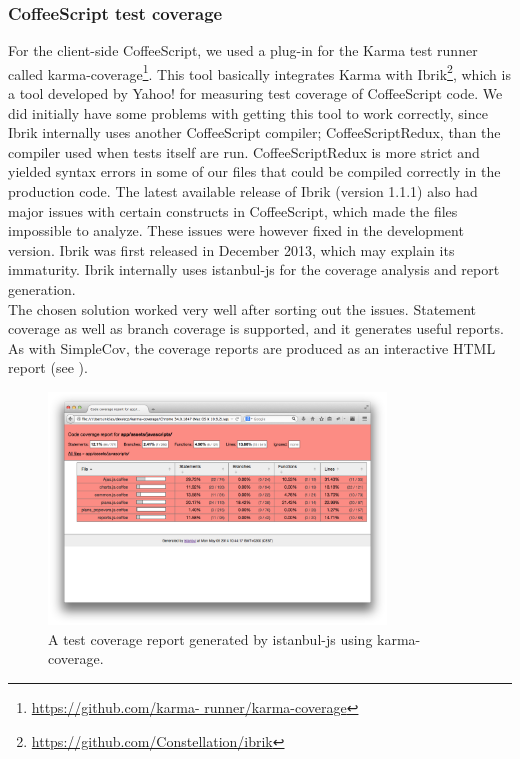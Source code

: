 \subsubsection{CoffeeScript test coverage}
For the client-side CoffeeScript, we used a plug-in for the Karma test
runner called karma-coverage\footnote{\url{https://github.com/karma-
runner/karma-coverage}}. This tool basically integrates Karma with
Ibrik\footnote{\url{https://github.com/Constellation/ibrik}}, which is a
tool developed by Yahoo! for measuring test coverage of CoffeeScript
code. We did initially have some problems with getting this tool to work
correctly, since Ibrik internally uses another CoffeeScript compiler;
CoffeeScriptRedux, than the compiler used when tests itself are run.
CoffeeScriptRedux is more strict and yielded syntax errors in some of
our files that could be compiled correctly in the production code. The
latest available release of Ibrik (version 1.1.1) also had major issues
with certain constructs in CoffeeScript, which made the files impossible
to analyze. These issues were however fixed in the development version.
Ibrik was first released in December 2013, which may explain its
immaturity. Ibrik internally uses istanbul-js for the coverage
analysis and report generation.\\

The chosen solution worked very well after sorting out the issues.
Statement coverage as well as branch coverage is supported, and it
generates useful reports. As with SimpleCov, the coverage reports are
produced as an interactive HTML report (see ).\\

\begin{figure}
\centering
\includegraphics[width=0.8\textwidth]{results/choices/karma_coverage}
\caption{A test coverage report generated by istanbul-js using karma-coverage.}
\label{fig:karma_report}
\end{figure}


